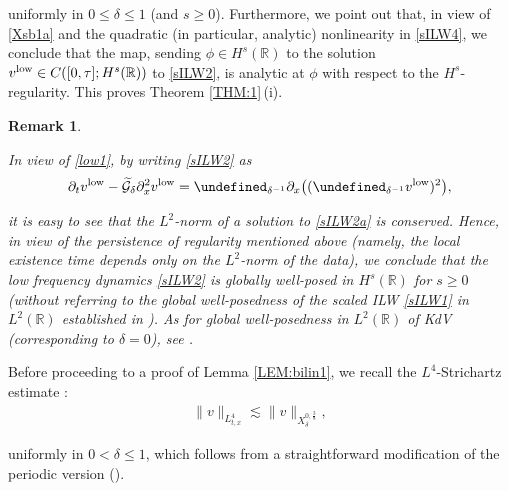 \documentclass[letterpaper, 11pt,  reqno]{amsart}
\newtheorem{remark}[theorem]{Remark}
\newcommand{\1}{\hspace{0.5mm}\textup{I}\hspace{0.5mm}}
\newcommand{\noi}{\noindent}
\newcommand{\R}{\mathbb{R}}
\let\P= \undefined
\newcommand{\P}{\mathbf{P}}
\newcommand{\low}{\textup{low}}
\newcommand{\dl}{\delta}
\newcommand{\wt}{\widetilde}
\newcommand{\dx}{\partial_x}
\newcommand{\dt}{\partial_t}
\newcommand{\Gd}{\wt{\mathcal{G}}_\dl}
\newcommand{\les}{\lesssim}
\numberwithin{equation}{section}
\numberwithin{theorem}{section}
\begin{document}
\noi
uniformly in 
$0 \le  \dl \le 1$ (and $s \ge 0$). 
Furthermore, we point out that, in view of \eqref{Xsb1a}
and the quadratic (in particular, analytic) nonlinearity in \eqref{sILW4}, 
we conclude that 
the map, sending $\phi \in H^s(\R)$
to the solution $v^\low  \in C([0, \tau]; H^s(\R))$
to \eqref{sILW2}, 
is analytic at $\phi$ with respect to the $H^s$-regularity.
This proves Theorem \ref{THM:1}\,(i).




\begin{remark}\label{REM:GWP1}
\rm 

In view of \eqref{low1}, by writing \eqref{sILW2}
as 
\begin{align}
\dt v^\low   -     \Gd   \dx^2 v^\low= \P_{ \dl^{-1}} \dx\big(( \P_{ \dl^{-1}}v^\low)^2\big), 
\label{sILW2a}
\end{align}

\noi
it is easy to see that the $L^2$-norm of a solution to \eqref{sILW2a}
is conserved.
Hence, 
in view of the persistence of regularity
mentioned above
(namely, 
 the local existence time depends only on the $L^2$-norm of the data), 
we conclude  that  the low frequency dynamics \eqref{sILW2}
is globally well-posed in $H^s(\R)$ for $s \ge 0$
(without referring
 to the global well-posedness of the scaled ILW \eqref{sILW1}
in $L^2(\R)$ established in \cite{IS, CLOP}).
As for global well-posedness in $L^2(\R)$
of KdV (corresponding to $\dl = 0$), see \cite{BO93, KPV96}.


\end{remark}




Before proceeding to  a proof of 
Lemma \ref{LEM:bilin1}, 
we 
 recall the $L^4$-Strichartz estimate \cite{BO93}:
\begin{align}
\| v \|_{L^4_{t, x}} \les 
\|v\|_{X^{0, \frac 38}_\dl}, 
\label{Str1}
\end{align}

\noi
uniformly in $0 < \dl \le 1$, 
which follows from a straightforward modification
of the periodic version (\cite[Lemma 2.11]{Li24}).
\end{document}
